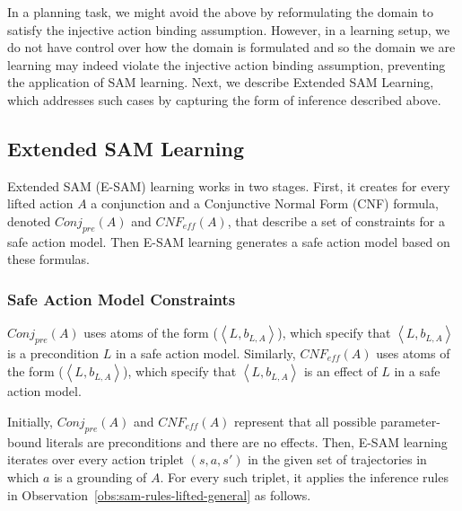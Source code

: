 \documentclass{article}
\newcommand{\tuple}[1]{\ensuremath{\left \langle #1 \right \rangle }}
\newcommand{\pre}{\textit{pre}}
\newcommand{\eff}{\textit{eff}}
\newcommand{\cnf}{\textit{CNF}}
\newcommand{\conj}{\textit{Conj}}
\newcommand{\liftl}{L}
\newcommand{\lifta}{A}
\newcommand{\iseff}{\text{IsEff}}
\newcommand{\ispre}{\text{IsPre}}
\begin{document}
In a planning task, we might avoid the above by reformulating the domain to satisfy the injective action binding assumption. However, in a learning setup, we do not have control over how the domain is formulated and so the domain we are learning may indeed violate the injective action binding assumption, preventing the application of SAM learning. Next, we describe Extended SAM Learning, which addresses such cases by capturing the form of inference described above. 


\subsection{Extended SAM Learning}
Extended SAM (E-SAM) learning works in two stages. First, it creates 
for every lifted action $\lifta$ a conjunction and a Conjunctive Normal Form (CNF) formula, denoted $\conj_\pre(\lifta)$ and $\cnf_\eff(\lifta)$, that describe a set of constraints for a safe action model. 
Then E-SAM learning generates a safe action model based on these formulas. 


\subsubsection{Safe Action Model Constraints}
$\conj_\pre(\lifta)$ uses atoms of the form 
\ispre($\tuple{\liftl,b_{\liftl,\lifta}}$), which specify that 
$\tuple{\liftl,b_{\liftl,\lifta}}$ is a precondition $\liftl$ in a safe action model. 
Similarly, $\cnf_\eff(\lifta)$ uses atoms of the form 
\iseff($\tuple{\liftl,b_{\liftl,\lifta}}$), 
which specify that $\tuple{\liftl,b_{\liftl,\lifta}}$ is an effect of $\liftl$ in a safe action model. 

Initially, $\conj_\pre(\lifta)$ and $\cnf_\eff(\lifta)$ 
represent that all possible parameter-bound literals are preconditions and there are no effects. 
Then, E-SAM learning iterates over every action triplet $(s, a, s')$ in the given set of trajectories in which $a$ is a grounding of $\lifta$. 
For every such triplet, it applies the inference rules in Observation~\ref{obs:sam-rules-lifted-general} as follows. 
\end{document}
